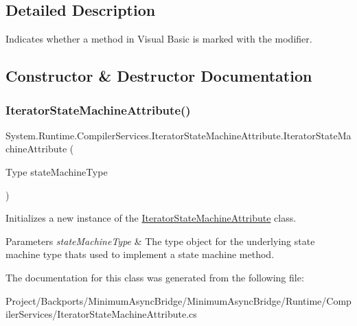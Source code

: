\subsection{Detailed Description}
Indicates whether a method in Visual Basic is marked with the  modifier. 



\subsection{Constructor \& Destructor Documentation}
\mbox{\label{class_system_1_1_runtime_1_1_compiler_services_1_1_iterator_state_machine_attribute_a8ddc925d5ed452fad9d81ece8b580661}} 
\subsubsection{\texorpdfstring{Iterator\+State\+Machine\+Attribute()}{IteratorStateMachineAttribute()}}
{\footnotesize\ttfamily System.\+Runtime.\+Compiler\+Services.\+Iterator\+State\+Machine\+Attribute.\+Iterator\+State\+Machine\+Attribute (\begin{DoxyParamCaption}\item[{Type}]{state\+Machine\+Type }\end{DoxyParamCaption})\hspace{0.3cm}{\ttfamily [inline]}}



Initializes a new instance of the \hyperlink{class_system_1_1_runtime_1_1_compiler_services_1_1_iterator_state_machine_attribute}{Iterator\+State\+Machine\+Attribute} class. 


\begin{DoxyParams}{Parameters}
{\em state\+Machine\+Type} & The type object for the underlying state machine type that\textquotesingle{}s used to implement a state machine method. \\
\hline
\end{DoxyParams}


The documentation for this class was generated from the following file\+:\begin{DoxyCompactItemize}
\item 
Project/\+Backports/\+Minimum\+Async\+Bridge/\+Minimum\+Async\+Bridge/\+Runtime/\+Compiler\+Services/Iterator\+State\+Machine\+Attribute.\+cs\end{DoxyCompactItemize}
